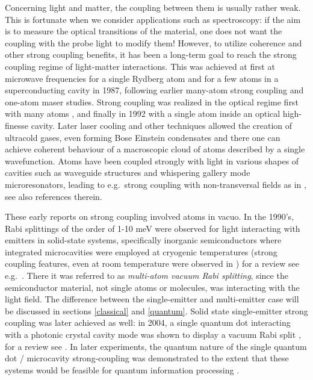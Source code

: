 \documentclass[12pt]{iopart}
\begin{document}
Concerning light and matter, the coupling between them is usually rather weak. This is fortunate when we consider applications such as spectroscopy: if the aim is to measure the optical transitions of the material, one does not want the coupling with the probe light to modify them! However, to utilize coherence and other strong coupling benefits, it has been a long-term goal to reach the strong coupling regime of light-matter interactions. This was achieved at first at microwave frequencies for a single Rydberg atom \cite{Rempe1987} and for a few atoms \cite{Brune1987} in a superconducting cavity in 1987, following earlier many-atom strong coupling \cite{Kaluzny1983} and one-atom maser \cite{Meschede1985} studies. 
Strong coupling was realized in the optical regime first with many atoms \cite{Raizen1989,Zhu1990,Rempe1991}, and finally in 1992 with a single atom \cite{Thompson1992}
inside an optical high-finesse cavity. Later laser cooling and other techniques allowed the creation of ultracold gases, even forming Bose Einstein condensates \cite{Anderson1995,Davis1995,Andrews1997} and there one can achieve coherent behaviour of a macroscopic cloud of atoms described by a single wavefunction. Atoms have been coupled strongly with light in various shapes of cavities
such as waveguide structures and whispering gallery mode microresonators, leading to e.g.\ strong coupling with non-transversal fields as in \cite{Junge2013}, see also references therein.

These early reports on strong coupling involved atoms in vacuo. In the 1990's, Rabi splittings of the order of 1-10 meV were observed for light interacting with emitters in solid-state systems, specifically inorganic semiconductors where integrated microcavities were employed at cryogenic temperatures \cite{Weisbuch1992,Houdre1994,Norris1994,Houdre1995} (strong coupling features, even at room temperature were observed in \cite{Houdre19942}) for a review see e.g.\ \cite{Skolnick1998}. There it was referred to as {\it multi-atom vacuum Rabi splitting}, since the semiconductor material, not single atoms or molecules, was interacting with the light field. The difference between the single-emitter and multi-emitter case will be discussed in sections \ref{classical} and \ref{quantum}. Solid state single-emitter strong coupling was later achieved as well: in 2004, a single quantum dot interacting with a photonic crystal cavity mode was shown to display a vacuum Rabi split \cite{Reithmaier_Nature_2004_432_197,Yoshle_Nature_2004_432_200}, for a review see \cite{Khitrova2006}. In later experiments, the quantum nature of the single quantum dot / microcavity strong-coupling was demonstrated to the extent that these systems would be feasible for quantum information processing \cite{Hennessy2007}. 
\end{document}
